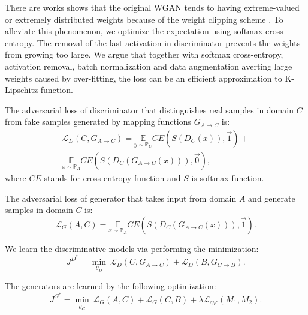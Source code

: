 \documentclass[10pt,conference,a4paper]{IEEEtran}
\begin{document}
There are works shows that the original WGAN tends to having extreme-valued or extremely distributed weights because of the weight clipping scheme \cite{improvewgan2017}. To alleviate this phenomenon, we optimize the expectation using softmax cross-entropy. The removal of the last activation in discriminator prevents the weights from growing too large. We argue that together with softmax cross-entropy, activation removal, batch normalization and data augmentation averting large weights caused by over-fitting, the loss can be an efficient approximation to K-Lipschitz function.

The adversarial loss of discriminator that distinguishes real samples in domain $C$ from fake samples generated by mapping functions $G_{A\rightarrow C}$ is:
\begin{multline}\label{eq:loss_da}
  \mathcal{L}_{D}(C,G_{A\rightarrow C}) = \underset{y\sim \mathbb{P}_C}{\mathbb{E}}  CE\left(S(D_C(x)),\vec{1} \right) +\\
  \underset{x\sim \mathbb{P}_A}{\mathbb{E}} CE\left(S(D_C( G_{A\rightarrow C}(x))),\vec{0} \right) ,
\end{multline}
where $CE$ stands for cross-entropy function and $S$ is softmax function.

The adversarial loss of generator that takes input from domain $A$ and generate samples in domain $C$ is:
\begin{equation}\label{eq:adv_loss_ga}
  \mathcal{L}_G(A,C)= \underset{x\sim \mathbb{P}_A}{\mathbb{E}} CE\left(S(D_C(G_{A\rightarrow C}(x))),\vec{1} \right).
\end{equation}

We learn the discriminative models via performing the minimization:
\begin{equation}\label{eq:objective_d}
J^{D^*} = \underset{\theta_D}{\min}~ \mathcal{L}_{D}(C,G_{A\rightarrow C})+\mathcal{L}_{D}(B,G_{C\rightarrow B}).
\end{equation}

The generators are learned by the following optimization:
\begin{equation}\label{eq:objective_g}
J^{G^*}= \underset{\substack{\theta_G}}{\min}~
\mathcal{L}_G(A,C)+
\mathcal{L}_G(C,B)+
\lambda \mathcal{L}_{cyc}(M_1,M_2).
\end{equation}


\end{document}
